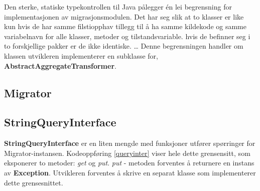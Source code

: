 Den sterke, statiske typekontrollen til Java pålegger én lei begrensning for implementasjonen av migrasjonsmodulen. Det har seg slik at to klasser er like kun hvis de har samme filstiopphav tillegg til å ha samme kildekode og samme variabelnavn for alle klasser, metoder og tilstandsvariable. hvis de befinner seg i to forskjellige pakker er de ikke identiske.
\ldots
Denne begrensningen handler om klassen utvikleren implementerer en subklasse for, \textbf{AbstractAggregateTransformer}.

\subsection{Migrator}









\subsection{StringQueryInterface}



\textbf{StringQueryInterface} er en liten mengde med funksjoner utfører spørringer for Migrator-instansen. Kodeoppføring \ref{queryinter} viser hele dette grensensitt, som eksponerer to metoder: \emph{get} og \emph{put}. \emph{put} - metoden forventes å returnere en instans av \textbf{Exception}. Utvikleren forventes å skrive en separat klasse som implementerer dette grensesnittet.




